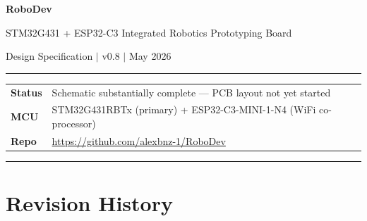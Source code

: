 \documentclass[11pt,a4paper]{article}
\begin{document}
\begin{titlepage}
  \centering
  \vspace*{2cm}
  {\Huge\bfseries RoboDev\par}
  \vspace{0.5cm}
  {\large STM32G431 + ESP32-C3 Integrated Robotics Prototyping Board\par}
  \vspace{0.3cm}
  {\normalsize Design Specification $\mid$ v0.8 $\mid$ May 2026\par}
  \vspace{2cm}
  \noindent\rule{\textwidth}{0.4pt}
  \vspace{0.5cm}

  \begin{tabular}{ll}
    \textbf{Status}  & Schematic substantially complete — PCB layout not yet started \\
    \textbf{MCU}     & STM32G431RBTx (primary) + ESP32-C3-MINI-1-N4 (WiFi co-processor) \\
    \textbf{Repo}    & \url{https://github.com/alexbnz-1/RoboDev} \\
  \end{tabular}
  \vspace{0.5cm}
  \noindent\rule{\textwidth}{0.4pt}
\end{titlepage}

\tableofcontents
\clearpage

\section*{Revision History}
\end{document}
